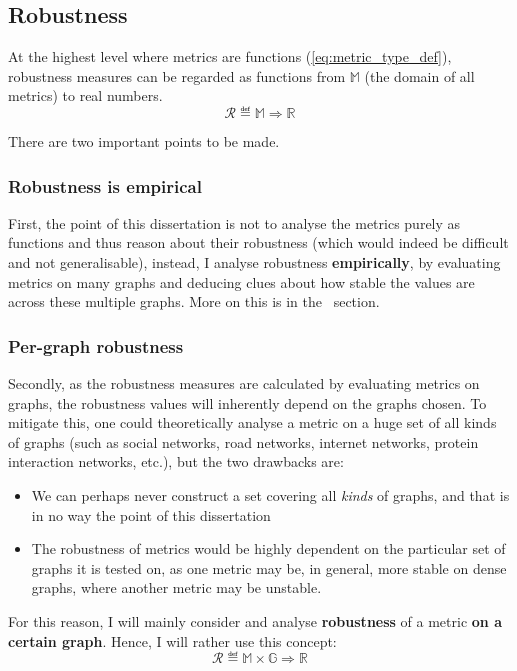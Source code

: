 \subsection{Robustness}

At the highest level where metrics are functions (\autoref{eq:metric_type_def}), robustness measures can be regarded as functions from $\mathbb{M}$ (the domain of all metrics) to real numbers.
\begin{equation}
    \mathcal{R} \eqdef \mathbb{M} \Rightarrow \mathbb{R}
\end{equation}

There are two important points to be made.

\subsubsection*{Robustness is empirical}

First, the point of this dissertation is not to analyse the metrics purely as functions and thus reason about their robustness (which would indeed be difficult and not generalisable), instead, I analyse robustness \textbf{empirically}, by evaluating metrics on many graphs and deducing clues about how stable the values are across these multiple graphs.
More on this is in the~ section.

\subsubsection*{Per-graph robustness}

Secondly, as the robustness measures are calculated by evaluating metrics on graphs, the robustness values will inherently depend on the graphs chosen.
To mitigate this, one could theoretically analyse a metric on a huge set of all kinds of graphs (such as social networks, road networks, internet networks, protein interaction networks, etc.), but the two drawbacks are:
\begin{itemize}
    \item We can perhaps never construct a set covering all \textsl{kinds} of graphs, and that is in no way the point of this dissertation
    \item The robustness of metrics would be highly dependent on the particular set of graphs it is tested on, as one metric may be, in general, more stable on dense graphs, where another metric may be unstable.
\end{itemize}

For this reason, I will mainly consider and analyse \textbf{robustness} of a metric \textbf{on a certain graph}.
Hence, I will rather use this concept:
\begin{equation}
    \mathcal{R} \eqdef \mathbb{M} \times \mathbb{G} \Rightarrow \mathbb{R}
\end{equation}

